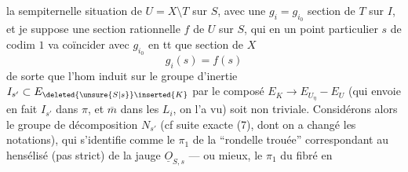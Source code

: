 la sempiternelle situation de $U=X\setminus T$ sur $S$, avec une $g_i=g_{i_0}$ section de $T$ sur $I$, et je suppose  une section rationnelle $f$ de $U$ sur $S$, qui en un point particulier $s$ de  codim $1$ va coïncider avec $g_{i_0}$ en tt que section de $X$
\[
g_i(s)=f(s)
\]
de sorte que l'hom induit sur le groupe d'inertie $I_{s'}\subset E_{\deleted{\unsure{S|s}}\inserted{K}}$ par le composé $E_K\longrightarrow E_{U_\eta}-E_U$ (qui envoie en fait $I_{s'}$ dans $\pi$, et $\overline m$ dans les $L_i$, on l'a vu) soit non  triviale. Considérons alors le groupe de décomposition $N_{s'}$ (cf suite exacte (7), dont on a changé les notations), qui s'identifie comme le $\pi_1$ de la ``rondelle trouée'' correspondant au hensélisé (pas strict) de la jauge $\underline O_{S,s}$ --- ou mieux, le $\pi_1$ du fibré en
